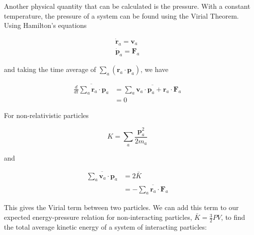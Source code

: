 \documentclass{article}
\begin{document}
\begin{multicols}{2}


Another physical quantity that can be calculated is the pressure.  With a constant temperature, the pressure of a system can be found using the Virial Theorem.  Using Hamilton's equations

\begin{equation}
\begin{split}
\dot{\textbf{r}}_a = \textbf{v}_a \\
\dot{\textbf{p}}_a = \textbf{F}_a 
\end{split}
\end{equation}

\noindent and taking the time average of $\sum \limits _a (\textbf{r}_a \cdot \textbf{p}_a)$, we have

\begin{equation}
\begin{split}
\overline{\frac{d}{dt} \sum \limits _a \textbf{r}_a \cdot \textbf{p}_a} & = \overline{\sum \limits _a \textbf{v}_a \cdot \textbf{p}_a + \textbf{r}_a \cdot \textbf{F}_a} \\
& = 0
\end{split}
\end{equation}

\noindent  For non-relativistic particles 

\begin{equation}
K = \sum \limits _a \frac{\textbf{p}_{a}^2}{2m_a}
\end{equation}

\noindent and 

\begin{equation}
\begin{split}
\overline{\sum \limits _a \textbf{v}_a \cdot \textbf{p}_a} & = 2\bar{K} \\
& = - \overline{\sum \limits _a \textbf{r}_a \cdot \textbf{F}_a}
\end{split}
\end{equation}

\noindent This gives the Virial term between two particles.  We can add this term to our expected energy-pressure relation for non-interacting particles, $\bar{K}=\frac{3}{2}PV$, to find the total average kinetic energy of a system of interacting particles:  


\end{multicols}
\end{document}
